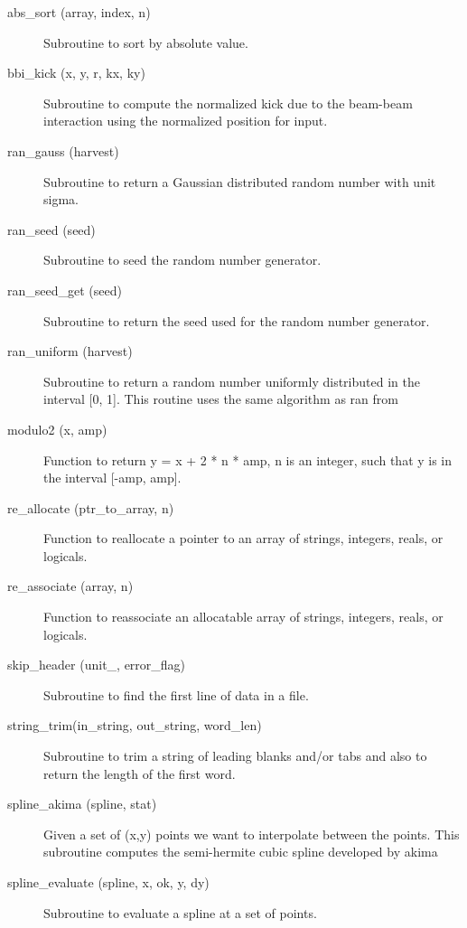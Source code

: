 \begin{description}

\item[abs\_sort (array, index, n)] \Newline 
  Subroutine to sort by absolute value.

\item[bbi\_kick (x, y, r, kx, ky)] \Newline 
Subroutine to compute the normalized kick due to the beam-beam
interaction using the normalized position for input.

\item[ran\_gauss (harvest)] \Newline 
Subroutine to return a Gaussian distributed random number with unit sigma.

\item[ran\_seed (seed)] \Newline 
Subroutine to seed the random number generator. 

\item[ran\_seed\_get (seed)] \Newline 
Subroutine to return the seed used for the random number generator.

\item[ran\_uniform (harvest)] \Newline 
Subroutine to return a random number uniformly distributed in the 
interval [0, 1]. This routine uses the same algorithm as ran from

\item[modulo2 (x, amp)] \Newline 
Function to return y = x + 2 * n * amp, n is an integer, such that y is 
in the interval [-amp, amp].

\item[re\_allocate (ptr\_to\_array, n)] \Newline 
Function to reallocate a pointer to an array of strings, integers, reals, or logicals.

\item[re\_associate (array, n)] \Newline 
Function to reassociate an allocatable array of strings, integers, reals, or logicals.

\item[skip\_header (unit\_, error\_flag)] \Newline 
Subroutine to find the first line of data in a file. 

\item[string\_trim(in\_string, out\_string, word\_len)] \Newline 
Subroutine to trim a string of leading blanks and/or tabs and also to return the
length of the first word.

\item[spline\_akima (spline, stat)] \Newline 
Given a set of (x,y) points we want to interpolate between the points.
This subroutine computes the semi-hermite cubic spline developed by akima

\item[spline\_evaluate (spline, x, ok, y, dy)] \Newline 
Subroutine to evaluate a spline at a set of points.

\end{description}

